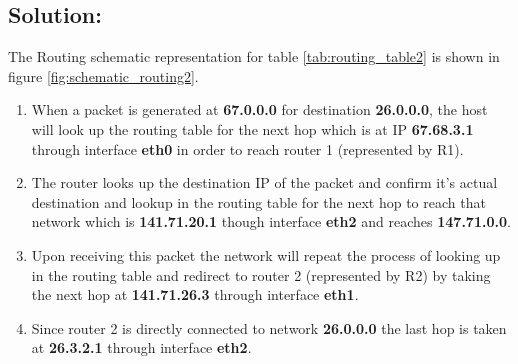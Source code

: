 \documentclass{resources/WeSTassignment}
\begin{document}
\begin{table}[h]
\centering
\caption{Routing Table for \ref{fig:schematic_routing1}}
\label{tab:routing_table1}
\end{table}

\subsection{Solution:}
The Routing schematic representation for table \ref{tab:routing_table2} is shown in figure \ref{fig:schematic_routing2}.\\
\begin{enumerate}
	\item When a packet is generated at \textbf{67.0.0.0} for destination \textbf{26.0.0.0}, the host will look up the routing table for the next hop which is at IP \textbf{67.68.3.1} through interface \textbf{eth0} in order to reach router 1 (represented by R1). 
	\item The router looks up the destination IP of the packet and confirm it's actual destination and lookup in the routing table for the next hop to reach that network which is \textbf{141.71.20.1} though interface \textbf{eth2} and reaches \textbf{147.71.0.0}. 
	\item Upon receiving this packet the network will repeat the process of looking up in the routing table and redirect to router 2 (represented by R2) by taking the next hop at \textbf{141.71.26.3} through interface \textbf{eth1}. 
	\item Since router 2 is directly connected to network \textbf{26.0.0.0} the last hop is taken at \textbf{26.3.2.1} through interface  \textbf{eth2}.
\end{enumerate}
\end{document}
